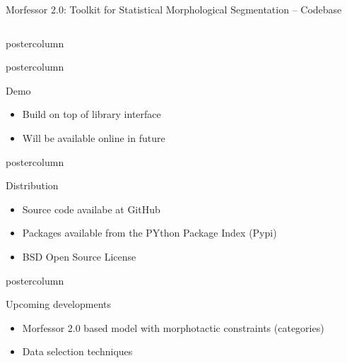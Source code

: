 \documentclass[final]{beamer} %
\begin{document}
\begin{frame}{Morfessor 2.0: Toolkit for Statistical Morphological Segmentation -- Codebase}
\begin{columns}
\begin{column}{.3\textwidth}
\begin{beamercolorbox}[center,wd=\textwidth]{postercolumn}
	\end{beamercolorbox}


  \begin{beamercolorbox}[center,wd=\textwidth]{postercolumn}
 \begin{block}{Demo}
	\begin{itemize}
\item Build on top of library interface
\item Will be available online in future

\end{itemize}

            \end{block}
            
	\end{beamercolorbox}



  \begin{beamercolorbox}[center,wd=\textwidth]{postercolumn}
 \begin{block}{Distribution}
              \begin{itemize}
              \item Source code availabe at GitHub
		\item Packages available from the PYthon Package Index (Pypi)
              \item BSD Open Source License
\end{itemize}
            \end{block}
            
	\end{beamercolorbox}


  \begin{beamercolorbox}[center,wd=\textwidth]{postercolumn}
 \begin{block}{Upcoming developments}
              \begin{itemize}
		\item Morfessor 2.0 based model with morphotactic constraints (categories) 
              \item Data selection techniques
		
\end{itemize}
            \end{block}
            

\end{beamercolorbox}
\end{column}
\end{columns}
\end{frame}
\end{document}
